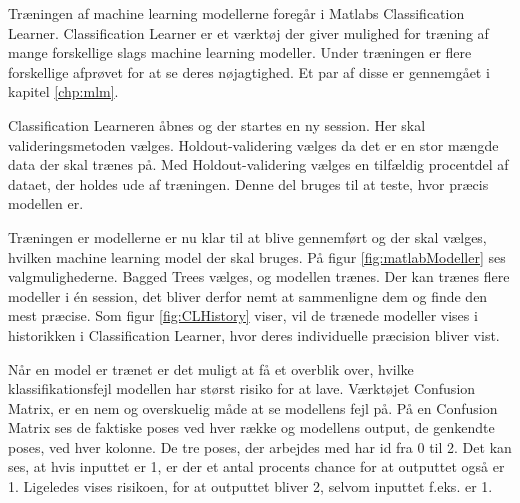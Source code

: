 Træningen af machine learning modellerne foregår i Matlabs Classification Learner\citep{matlabClassificationLearner}. Classification Learner er et værktøj der giver mulighed for træning af mange forskellige slags machine learning modeller. Under træningen er flere forskellige afprøvet for at se deres nøjagtighed. Et par af disse er gennemgået i kapitel \ref{chp:mlm}.

Classification Learneren åbnes og der startes en ny session. Her skal valideringsmetoden vælges. Holdout-validering vælges da det er en stor mængde data der skal trænes på. Med Holdout-validering vælges en tilfældig procentdel af dataet, der holdes ude af træningen. Denne del bruges til at teste, hvor præcis modellen er\citep{matlabValidation}.


Træningen er modellerne er nu klar til at blive gennemført og der skal vælges, hvilken machine learning model der skal bruges. På figur \ref{fig:matlabModeller} ses valgmulighederne.
Bagged Trees vælges, og modellen trænes.
Der kan trænes flere modeller i én session, det bliver derfor nemt at sammenligne dem og finde den mest præcise. Som figur \ref{fig:CLHistory} viser, vil de trænede modeller vises i historikken i Classification Learner, hvor deres individuelle præcision bliver vist.

Når en model er trænet er det muligt at få et overblik over, hvilke klassifikationsfejl modellen har størst risiko for at lave. Værktøjet Confusion Matrix, er en nem og overskuelig måde at se modellens fejl på. På en Confusion Matrix ses de faktiske poses ved hver række og modellens output, de genkendte poses, ved hver kolonne. De tre poses, der arbejdes med har id fra 0 til 2. Det kan ses, at hvis inputtet er 1, er der et antal procents chance for at outputtet også er 1. Ligeledes vises risikoen, for at outputtet bliver 2, selvom inputtet f.eks. er 1.


